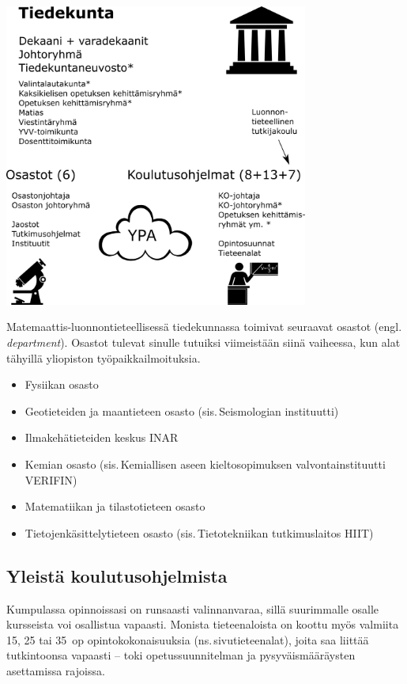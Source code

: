 \documentclass[a5paper, 8pt, twocolumn]{book} %
\numberwithin{equation}{section}
\begin{document}
\vspace{0.5cm}
\begin{center}\includegraphics[width=0.75\textwidth]{uusitiedekunta.png}\end{center}

Matemaattis-luonnontieteellisessä tiedekunnassa toimivat seuraavat osastot (engl.\,\textit{department}). Osastot tulevat sinulle tutuiksi viimeistään siinä vaiheessa, kun alat tähyillä yliopiston työpaikka\-ilmoituksia.
\begin{itemize}
	\item Fysiikan osasto
	\item Geotieteiden ja maantieteen osasto (sis.\,Seismologian instituutti)
	\item Ilmakehätieteiden keskus INAR
	\item Kemian osasto (sis.\,Kemiallisen aseen kieltosopimuksen valvontainstituutti VERIFIN)
	\item Matematiikan ja tilastotieteen osasto
	\item Tietojenkäsittelytieteen osasto (sis.\,Tietotekniikan tutkimuslaitos HIIT)
\end{itemize}
 
\twocolumn
\subsection*{Yleistä koulutusohjelmista}
Kumpulassa opinnoissasi on runsaasti valinnanvaraa, sillä suurimmalle osalle kursseista voi osallistua vapaasti. Monista tieteenaloista on koottu myös valmiita 15, 25 tai 35~op opintokokonaisuuksia (ns.\,sivutieteenalat), joita saa liittää tutkintoonsa vapaasti -- toki opetussuunnitelman ja pysyväismääräysten asettamissa rajoissa.
\end{document}
